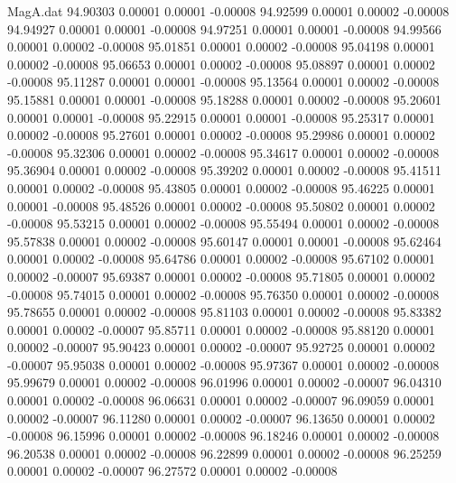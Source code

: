 \begin{filecontents}{MagA.dat}
  94.90303    0.00001    0.00001   -0.00008
  94.92599    0.00001    0.00002   -0.00008
  94.94927    0.00001    0.00001   -0.00008
  94.97251    0.00001    0.00001   -0.00008
  94.99566    0.00001    0.00002   -0.00008
  95.01851    0.00001    0.00002   -0.00008
  95.04198    0.00001    0.00002   -0.00008
  95.06653    0.00001    0.00002   -0.00008
  95.08897    0.00001    0.00002   -0.00008
  95.11287    0.00001    0.00001   -0.00008
  95.13564    0.00001    0.00002   -0.00008
  95.15881    0.00001    0.00001   -0.00008
  95.18288    0.00001    0.00002   -0.00008
  95.20601    0.00001    0.00001   -0.00008
  95.22915    0.00001    0.00001   -0.00008
  95.25317    0.00001    0.00002   -0.00008
  95.27601    0.00001    0.00002   -0.00008
  95.29986    0.00001    0.00002   -0.00008
  95.32306    0.00001    0.00002   -0.00008
  95.34617    0.00001    0.00002   -0.00008
  95.36904    0.00001    0.00002   -0.00008
  95.39202    0.00001    0.00002   -0.00008
  95.41511    0.00001    0.00002   -0.00008
  95.43805    0.00001    0.00002   -0.00008
  95.46225    0.00001    0.00001   -0.00008
  95.48526    0.00001    0.00002   -0.00008
  95.50802    0.00001    0.00002   -0.00008
  95.53215    0.00001    0.00002   -0.00008
  95.55494    0.00001    0.00002   -0.00008
  95.57838    0.00001    0.00002   -0.00008
  95.60147    0.00001    0.00001   -0.00008
  95.62464    0.00001    0.00002   -0.00008
  95.64786    0.00001    0.00002   -0.00008
  95.67102    0.00001    0.00002   -0.00007
  95.69387    0.00001    0.00002   -0.00008
  95.71805    0.00001    0.00002   -0.00008
  95.74015    0.00001    0.00002   -0.00008
  95.76350    0.00001    0.00002   -0.00008
  95.78655    0.00001    0.00002   -0.00008
  95.81103    0.00001    0.00002   -0.00008
  95.83382    0.00001    0.00002   -0.00007
  95.85711    0.00001    0.00002   -0.00008
  95.88120    0.00001    0.00002   -0.00007
  95.90423    0.00001    0.00002   -0.00007
  95.92725    0.00001    0.00002   -0.00007
  95.95038    0.00001    0.00002   -0.00008
  95.97367    0.00001    0.00002   -0.00008
  95.99679    0.00001    0.00002   -0.00008
  96.01996    0.00001    0.00002   -0.00007
  96.04310    0.00001    0.00002   -0.00008
  96.06631    0.00001    0.00002   -0.00007
  96.09059    0.00001    0.00002   -0.00007
  96.11280    0.00001    0.00002   -0.00007
  96.13650    0.00001    0.00002   -0.00008
  96.15996    0.00001    0.00002   -0.00008
  96.18246    0.00001    0.00002   -0.00008
  96.20538    0.00001    0.00002   -0.00008
  96.22899    0.00001    0.00002   -0.00008
  96.25259    0.00001    0.00002   -0.00007
  96.27572    0.00001    0.00002   -0.00008

\end{filecontents}
